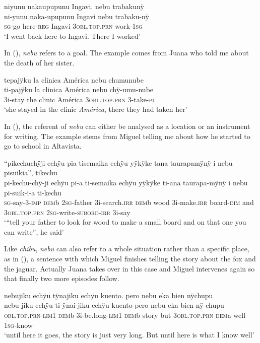 \ea\label{ex:nebu-4}
\begingl
\glpreamble niyunu nakaupupunu Ingavi. nebu trabakunÿ\\
\gla ni-yunu naka-upupunu Ingavi nebu trabaku-nÿ\\
\textsc{sg}-go here-\textsc{reg} Ingavi 3\textsc{obl.top.prn} work-1\textsc{sg}\\
\glft ‘I went back here to Ingavi. There I worked’
\endgl
\trailingcitation{[mqx-p110826l.478-480]}
\xe

In (), \textit{nebu} refers to a goal. The example comes from Juana who told me about the death of her sister.

\ea\label{ex:nebu-5}
\begingl
\glpreamble tepajÿku la clinica América nebu chumunube\\
\gla ti-pajÿku {la clinica América} nebu chÿ-umu-nube\\
\glb 3i-stay {the clinic América} 3\textsc{obl.top.prn} 3-take-\textsc{pl}\\
\glft ‘she stayed in the clinic \textit{América}, there they had taken her’
\endgl
\trailingcitation{[jxx-p120430l-2.215-217]}
\xe

In (), the referent of \textit{nebu} can either be analysed as a location or an instrument for writing. The example stems from Miguel telling me about how he started to go to school in Altavista. 

\ea\label{ex:nebu-2}
\begingl
\glpreamble “pikechuchÿji echÿu pia tisemaika echÿu yÿkÿke tana taurapamÿnÿ i nebu pisuikia”, tikechu\\
\gla pi-kechu-chÿ-ji echÿu pi-a ti-semaika echÿu yÿkÿke ti-ana taurapa-mÿnÿ i nebu pi-suik-i-a ti-kechu\\
\textsc{sg}-say-3-\textsc{imp} \textsc{dem}b 2\textsc{sg}-father 3i-search.\textsc{irr} \textsc{dem}b wood 3i-make.\textsc{irr} board-\textsc{dim} and 3\textsc{obl.top.prn} 2\textsc{sg}-write-\textsc{subord}-\textsc{irr} 3i-say\\
\glft ‘“tell your father to look for wood to make a small board and on that one you can write”, he said’
\trailingcitation{[mxx-p181027l-1.022]}
\endgl
\xe

Like \textit{chibu}, \textit{nebu} can also refer to a whole situation rather than a specific place, as in (), a sentence with which Miguel finishes telling the story about the fox and the jaguar. Actually Juana takes over in this case and Miguel intervenes again so that finally two more episodes follow.

\ea\label{ex:nebu-6}
\begingl
\glpreamble nebujiku echÿu tÿnajiku echÿu kuento. pero nebu eka bien nÿchupu\\
\gla nebu-jiku echÿu ti-ÿnai-jiku echÿu kuento pero nebu eka bien nÿ-chupu\\
\textsc{obl.top.prn}-\textsc{lim}1 \textsc{dem}b 3i-be.long-\textsc{lim}1 \textsc{dem}b story but 3\textsc{obl.top.prn} \textsc{dem}a well 1\textsc{sg}-know\\
\glft ‘until here it goes, the story is just very long. But until here is what I know well’
\endgl
\trailingcitation{[jmx-n120429ls-x5.216-219]}
\xe

